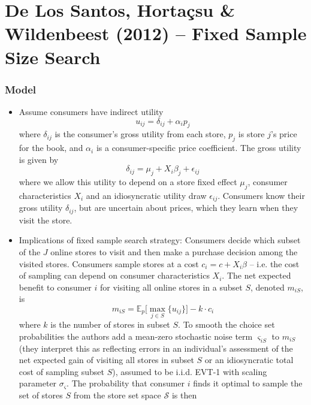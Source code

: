 \documentclass[11pt]{article}
\numberwithin{equation}{section}
\begin{document}
	\section{De Los Santos, Horta\c{c}su \& Wildenbeest (2012) -- Fixed Sample Size Search}
		\subsubsection*{Model}
		\begin{itemize}
		\item Assume consumers have indirect utility
		\begin{equation}
		u_{ij}=\delta_{ij} + \alpha_ip_j
		\end{equation}
		where $\delta_{ij}$ is the consumer's gross utility from each store, $p_j$ is store $j$'s price for the book, and $\alpha_i$ is a consumer-specific price coefficient. The gross utility is given by
		\begin{equation}
		\delta_{ij} = \mu_{j} + X_i\beta_j + \epsilon_{ij}
		\end{equation}
		where we allow this utility to depend on a store fixed effect $\mu_j$, consumer characteristics $X_i$ and an idiosyncratic utility draw $\epsilon_{ij}$. Consumers know their gross utility $\delta_{ij}$, but are uncertain about prices, which they learn when they visit the store.
		\item Implications of fixed sample search strategy: Consumers decide which subset of the $J$ online stores to visit and then make a purchase decision among the visited stores. Consumers sample stores at a cost $c_i=c + X_i\beta$ -- i.e. the cost of sampling can depend on consumer characteristics $X_i$. The net expected benefit to consumer $i$ for visiting all online stores in a subset $S$, denoted $m_{iS}$, is
		\begin{equation}
      \label{delos_m}
		m_{iS} = \mathbb{E}_p\bigg[\max_{j\in S}\{u_{ij}\}\bigg] - k\cdot c_i
		\end{equation}
		where $k$ is the number of stores in subset $S.$ To smooth the choice set probabilities the authors add a mean-zero stochastic noise term $\varsigma_{iS}$ to $m_{iS}$ (they interpret this as reflecting errors in an individual's assessment of the net expected gain of visiting all stores in subset $S$ or an idiosyncratic total cost of sampling subset $S$), assumed to be i.i.d. EVT-1 with scaling parameter $\sigma_{\varsigma}$.
		The probability that consumer $i$ finds it optimal to sample the set of stores $S$ from the store set space $\mathscr{S}$ is then

\end{itemize}
\end{document}
